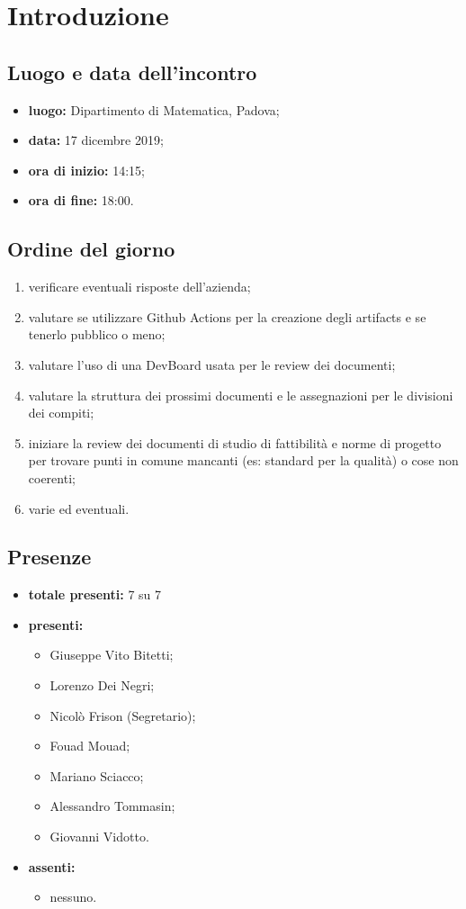 \section*{Introduzione}

\subsection*{Luogo e data dell'incontro}
	\begin{itemize}
		\item \textbf{luogo:} Dipartimento di Matematica, Padova;
		\item \textbf{data:} 17 dicembre 2019;
		\item \textbf{ora di inizio:} 14:15;
		\item \textbf{ora di fine:} 18:00.
	\end{itemize}

\subsection*{Ordine del giorno}
	\begin{enumerate}
		\item verificare eventuali risposte dell'azienda;
		\item valutare se utilizzare Github Actions per la creazione degli artifacts e se tenerlo pubblico o meno;
		\item valutare l'uso di una DevBoard usata per le review dei documenti;
		\item valutare la struttura dei prossimi documenti e le assegnazioni per le divisioni dei compiti;
		\item iniziare la review dei documenti di studio di fattibilità e norme di progetto per trovare punti in comune mancanti (es: standard per la qualità) o cose non coerenti;
		\item varie ed eventuali.
	\end{enumerate}

\subsection*{Presenze}
	\begin{itemize}
		\item \textbf{totale presenti:} 7 su 7
		\item \textbf{presenti: }
			\begin{itemize}			
				\item Giuseppe Vito Bitetti;
				\item Lorenzo Dei Negri;
				\item Nicolò Frison (Segretario);
				\item Fouad Mouad;
				\item Mariano Sciacco;
				\item Alessandro Tommasin;
				\item Giovanni Vidotto.
			\end{itemize}
		\item \textbf{assenti: } 
			\begin{itemize}	
				\item nessuno.
			\end{itemize}
	\end{itemize}


